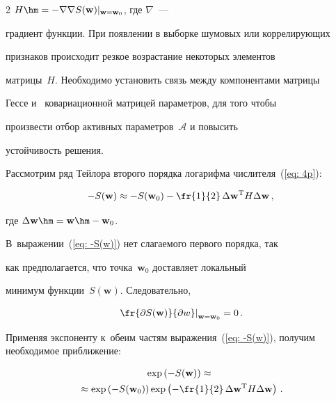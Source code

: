 \begin{multicols}{2}
$H\hm= - \nabla \nabla S(\mathbf{w})|_{\mathbf{w=w}_0}$, где $\nabla$~---

градиент функции. При появлении в выборке шумовых или коррелирующих

признаков происходит резкое возрастание некоторых элементов

матрицы~$H$. Необходимо установить связь между компонентами матрицы

Гессе и~ ковариационной матрицей параметров, для того чтобы

произвести отбор активных параметров~$\mathcal{A}$ и повысить

устойчивость решения.



Рассмотрим ряд Тейлора второго порядка логарифма числителя~(\ref{eq: 4p}):



\noindent

\begin{equation}

\label {eq: -S(w)}

-S(\mathbf{w}) \approx -S(\mathbf{w}_0)-\fr{1}{2}\,\Delta\mathbf{w}^{\mathrm{T}}H\Delta\mathbf{w}\,,

\end{equation}

где $\Delta\mathbf{w}\hm=\mathbf{w}\hm-\mathbf{w}_0$.

В~выражении~(\ref{eq: -S(w)}) нет сла\-га\-емо\-го первого порядка, так

как предполагается, что точка~$\mathbf{w}_0$ доставляет локальный

минимум функции~$S(\mathbf{w})$. Следовательно,

$$

\left. \fr{\partial S(\mathbf{w})}{\partial w} \right|_{\mathbf{w} = \mathbf{w}_0}  = 0\,.

$$

Применяя экспоненту к~обеим частям выражения~(\ref{eq: -S(w)}), получим необходимое приближение:

\begin{multline}

\label {eq: exp(-S(w))}

\exp\left(-S(\mathbf{w})\right) \approx {}\\

{}\approx\exp\left(-S(\mathbf{w}_0)\right)

\exp\left(-\fr{1}{2}\,\Delta\mathbf{w}^{\mathrm{T}}H\Delta\mathbf{w}\right)\,.


\end{multline}
\end{multicols}
